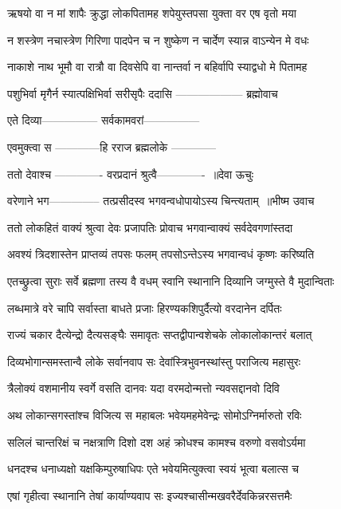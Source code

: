 \twolineshloka
{ऋषयो वा न मां शापैः क्रुद्धा लोकपितामह}
{शपेयुस्तपसा युक्ता वर एष वृतो मया}


\twolineshloka
{न शस्त्रेण नचास्त्रेण गिरिणा पादपेन च}
{न शुष्केण न चार्देण स्यान्न वाऽन्येन मे वधः}


\twolineshloka
{नाकाशे नाथ भूमौ वा रात्रौ वा दिवसेपि वा}
{नान्तर्वा न बहिर्वापि स्याद्वधो मे पितामह}


\fourlineindentedshloka
{पशुभिर्वा मृगैर्न स्यात्पक्षिभिर्वा सरीसृपैः}
{ददासि ------------------}
{ब्रह्मोवाच}
{}


\twolineshloka
{एते दिव्या---------------}
{सर्वकामवरां---------------}


\twolineshloka
{एवमुक्त्वा स ------------हि}
{रराज ब्रह्मलोके ------------}


\threelineshloka
{ततो देवाश्च -------------}
{वरप्रदानं श्रुत्वै------------- ॥देवा ऊचुः}
{}


\twolineshloka
{वरेणाने भग--------------}
{तत्प्रसीदस्व भगवन्वधोपायोऽस्य चिन्त्यताम् ॥भीष्म उवाच}


\twolineshloka
{ततो लोकहितं वाक्यं श्रुत्वा देवः प्रजापतिः}
{प्रोवाच भगवान्वाक्यं सर्वदेवगणांस्तदा}


\twolineshloka
{अवश्यं त्रिदशास्तेन प्राप्तव्यं तपसः फलम्}
{तपसोऽन्तेऽस्य भगवान्वधं कृष्णः करिष्यति}


\twolineshloka
{एतच्छ्रुत्वा सुराः सर्वे ब्रह्मणा तस्य वै वधम्}
{स्वानि स्थानानि दिव्यानि जग्मुस्ते वै मुदान्विताः}


\twolineshloka
{लब्धमात्रे वरे चापि सर्वास्ता बाधते प्रजाः}
{हिरण्यकशिपुर्दैत्यो वरदानेन दर्पितः}


\twolineshloka
{राज्यं चकार दैत्येन्द्रो दैत्यसङ्घैः समावृतः}
{सप्तद्वीपान्वशेचके लोकालोकान्तरं बलात्}


\twolineshloka
{दिव्यभोगान्समस्तान्वै लोके सर्वानवाप सः}
{देवांस्त्रिभुवनस्थांस्तु पराजित्य महासुरः}


\twolineshloka
{त्रैलोक्यं वशमानीय स्वर्गे वसति दानवः}
{यदा वरमदोन्मत्तो न्यवसद्दानवो दिवि}


\twolineshloka
{अथ लोकान्सगस्तांश्च विजित्य स महाबलः}
{भवेयमहमेवेन्द्रः सोमोऽग्निर्मारुतो रविः}


\twolineshloka
{सलिलं चान्तरिक्षं च नक्षत्राणि दिशो दश}
{अहं क्रोधश्च कामश्च वरुणो वसवोऽर्यमा}


\twolineshloka
{धनदश्च धनाध्यक्षो यक्षकिम्पुरुषाधिपः}
{एते भवेयमित्युक्त्वा स्वयं भूत्वा बलात्स च}


\twolineshloka
{एषां गृहीत्वा स्थानानि तेषां कार्याण्यवाप सः}
{इज्यश्चासीन्मखवरैर्देवकिन्नरसत्तमैः}


